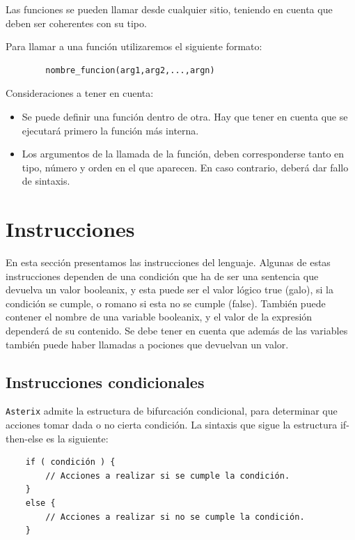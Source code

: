 \documentclass[a4paper, 10pt]{article}
\newcommand{\atx}{\texttt{Asterix} }
\begin{document}
    Las funciones se pueden llamar desde cualquier sitio, teniendo en cuenta
    que deben ser coherentes con su tipo.
    
    Para llamar a una función utilizaremos el siguiente formato:
    \begin{verbatim}
        nombre_funcion(arg1,arg2,...,argn)
    \end{verbatim}
    
    Consideraciones a tener en cuenta:
    \begin{itemize}
        \item Se puede definir una función dentro de otra. Hay que tener en
            cuenta que se ejecutará primero la función más interna.
        \item Los argumentos de la llamada de la función, deben corresponderse
            tanto en tipo, número y orden en el que aparecen. En caso
            contrario, deberá dar fallo de sintaxis.
    \end{itemize}

    \section*{Instrucciones}
    En esta sección presentamos las instrucciones del lenguaje. Algunas de estas
    instrucciones dependen de una condición que ha de ser una sentencia que
    devuelva un valor booleanix, y esta puede ser el valor lógico true (galo),
    si la condición se cumple, o romano si esta no se cumple (false). También
    puede contener el nombre de una variable booleanix, y el valor de la
    expresión dependerá de su contenido. Se debe tener en cuenta que además de
    las variables también puede haber llamadas a pociones que devuelvan un
    valor.

    \subsection*{Instrucciones condicionales}
    \atx admite la estructura de bifurcación condicional, para determinar que
    acciones tomar dada o no cierta condición. La sintaxis que sigue la
    estructura if-then-else es la siguiente:
    
    \begin{verbatim}
    if ( condición ) { 
        // Acciones a realizar si se cumple la condición.
    }
    else {
        // Acciones a realizar si no se cumple la condición.
    }
    \end{verbatim}
    
\end{document}
